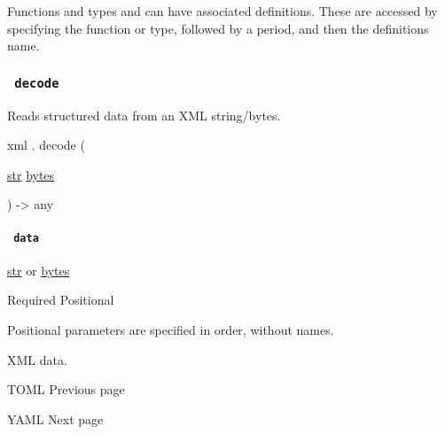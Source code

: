 \label{definitions-tooltip}
Functions and types and can have associated definitions. These are
accessed by specifying the function or type, followed by a period, and
then the definition\textquotesingle s name.

\subsubsection{\texorpdfstring{\texttt{\ decode\ }}{ decode }}\label{definitions-decode}

Reads structured data from an XML string/bytes.

xml { . } { decode } (

{ \href{/docs/reference/foundations/str/}{str}
\href{/docs/reference/foundations/bytes/}{bytes} }

) -\textgreater{} { any }

\paragraph{\texorpdfstring{\texttt{\ data\ }}{ data }}\label{definitions-decode-data}

\href{/docs/reference/foundations/str/}{str} {or}
\href{/docs/reference/foundations/bytes/}{bytes}

{Required} {{ Positional }}

\label{definitions-decode-data-positional-tooltip}
Positional parameters are specified in order, without names.

XML data.

\href{/docs/reference/data-loading/toml/}{\pandocbounded{}}

{ TOML } { Previous page }

\href{/docs/reference/data-loading/yaml/}{\pandocbounded{}}

{ YAML } { Next page }
